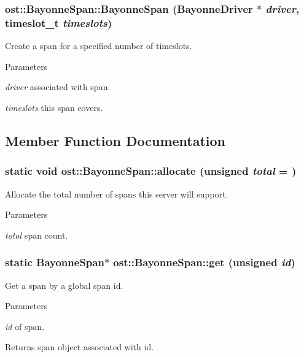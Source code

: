 \subsubsection[{BayonneSpan}]{\setlength{\rightskip}{0pt plus 5cm}ost::BayonneSpan::BayonneSpan ({\bf BayonneDriver} $\ast$ {\em driver}, \/  {\bf timeslot\_\-t} {\em timeslots})}\label{classost_1_1_bayonne_span_a0cff1b248e84238f8214d708c6788933}


Create a span for a specified number of timeslots. 
\begin{DoxyParams}{Parameters}
\item[{\em driver}]associated with span. \item[{\em timeslots}]this span covers. \end{DoxyParams}


\subsection{Member Function Documentation}
\subsubsection[{allocate}]{\setlength{\rightskip}{0pt plus 5cm}static void ost::BayonneSpan::allocate (unsigned {\em total} = {})\hspace{0.3cm}{\ttfamily  [static]}}\label{classost_1_1_bayonne_span_a411157186cecd58ab14b758808a00ba3}


Allocate the total number of spans this server will support. 
\begin{DoxyParams}{Parameters}
\item[{\em total}]span count. \end{DoxyParams}
\subsubsection[{get}]{\setlength{\rightskip}{0pt plus 5cm}static {\bf BayonneSpan}$\ast$ ost::BayonneSpan::get (unsigned {\em id})\hspace{0.3cm}{\ttfamily  [static]}}\label{classost_1_1_bayonne_span_a3ca93a7ea3770cbdd697fd243c458c69}


Get a span by a global span id. 
\begin{DoxyParams}{Parameters}
\item[{\em id}]of span. \end{DoxyParams}
\begin{DoxyReturn}{Returns}
span object associated with id. 
\end{DoxyReturn}
